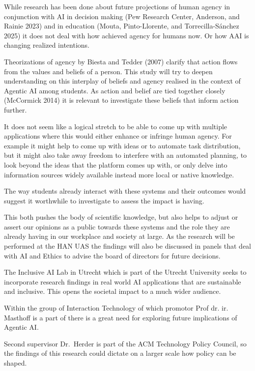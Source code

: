 \documentclass[
  letterpaper,
  DIV=11,
  numbers=noendperiod]{scrartcl}
\begin{document}
While research has been done about future projections of human agency in
conjunction with AI in decision making (Pew Research Center, Anderson,
and Rainie 2023) and in education (Mouta, Pinto-Llorente, and
Torrecilla-Sánchez 2025) it does not deal with how achieved agency for
humans now. Or how AAI is changing realized intentions.

Theorizations of agency by Biesta and Tedder (2007) clarify that action
flows from the values and beliefs of a person. This study will try to
deepen understanding on this interplay of beliefs and agency realised in
the context of Agentic AI among students. As action and belief are tied
together closely (McCormick 2014) it is relevant to investigate these
beliefs that inform action further.

It does not seem like a logical stretch to be able to come up with
multiple applications where this would either enhance or infringe human
agency. For example it might help to come up with ideas or to automate
task distribution, but it might also take away freedom to interfere with
an automated planning, to look beyond the ideas that the platform comes
up with, or only delve into information sources widely available instead
more local or native knowledge.

The way students already interact with these systems and their outcomes
would suggest it worthwhile to investigate to assess the impact is
having.

This both pushes the body of scientific knowledge, but also helps to
adjust or assert our opinions as a public towards these systems and the
role they are already having in our workplace and society at large. As
the research will be performed at the HAN UAS the findings will also be
discussed in panels that deal with AI and Ethics to advise the board of
directors for future decisions.

The Inclusive AI Lab in Utrecht which is part of the Utrecht University
seeks to incorporate research findings in real world AI applications
that are sustainable and inclusive. This opens the societal impact to a
much wider audience.

Within the group of Interaction Technology of which promotor Prof dr.
ir. Masthoff is a part of there is a great need for exploring future
implications of Agentic AI.

Second supervisor Dr.~Herder is part of the ACM Technology Policy
Council, so the findings of this research could dictate on a larger
scale how policy can be shaped.
\end{document}
